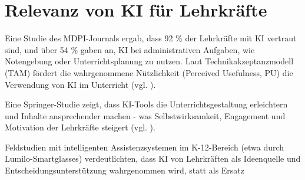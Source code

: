 \section{Relevanz von KI für Lehrkräfte}
Eine Studie des MDPI-Journals ergab, dass 92 \% der Lehrkräfte mit KI vertraut sind, und über 54 \% gaben an, KI bei administrativen Aufgaben, wie Notengebung oder Unterrichtsplanung zu nutzen. Laut Technikakzeptanzmodell (TAM) fördert die wahrgenommene Nützlichkeit (Perceived Usefulness, PU) die Verwendung von KI im Unterricht (vgl. \cite{}).

Eine Springer-Studie zeigt, dass KI-Tools die Unterrichtsgestaltung erleichtern und Inhalte ansprechender machen - was Selbstwirksamkeit, Engagement und Motivation der Lehrkräfte steigert (vgl. \cite{}).

Feldstudien mit intelligenten Assistenzsystemen im K-12-Bereich (etwa durch Lumilo-Smartglasses) verdeutlichten, dass KI von Lehrkräften als Ideenquelle und Entscheidungsunterstützung wahrgenommen wird, statt als Ersatz

